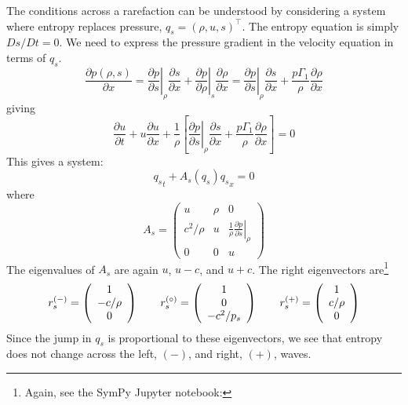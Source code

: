 The conditions across a rarefaction can be understood by considering
a system where entropy replaces pressure, $q_s = (\rho, u, s)^\intercal$.
The entropy equation is simply $Ds/Dt = 0$.  We need to express the
pressure gradient in the velocity equation in terms of $q_s$.
\begin{equation}
\frac{\partial p(\rho, s)}{\partial x} =
  \left . \frac{\partial p}{\partial s} \right |_\rho \frac{\partial s}{\partial x} +
  \left . \frac{\partial p}{\partial \rho} \right |_s \frac{\partial \rho}{\partial x}
=
  \left . \frac{\partial p}{\partial s} \right |_\rho \frac{\partial s}{\partial x} +
  \frac{p\Gamma_1}{\rho} \frac{\partial \rho}{\partial x}
\end{equation}
giving
\begin{equation}
\frac{\partial u}{\partial t} + u \frac{\partial u}{\partial x} + \frac{1}{\rho} \left [
     \left . \frac{\partial p}{\partial s} \right |_\rho \frac{\partial s}{\partial x} +
          \frac{p\Gamma_1}{\rho} \frac{\partial \rho}{\partial x} \right ] = 0
\end{equation}
This gives a system:
\begin{equation}
{q_s}_t + A_s(q_s) {q_s}_x = 0
\end{equation}
where
\begin{equation}
A_s =
 \left ( \begin{array}{ccc} u & \rho & 0 \\
        c^2/\rho & u & \frac{1}{\rho} \left . \frac{\partial p}{\partial s}\right |_\rho \\
        0 & 0 & u \end{array} \right )
\end{equation}
The eigenvalues of $A_s$ are again $u$, $u-c$, and $u+c$.  The right eigenvectors
are\footnote{Again, see the {\sf SymPy} {\sf Jupyter} notebook:
}
\begin{align}
r_s^\evm = \left ( \begin{array}{c} 1 \\ -c/\rho \\ 0 \end{array} \right )
%
\qquad
r_s^\evz = \left ( \begin{array}{c} 1 \\ 0 \\ -c^2/p_s  \end{array} \right )
%
\qquad
r_s^\evp = \left ( \begin{array}{c} 1 \\ c/\rho \\ 0 \end{array} \right )
\end{align}
Since the jump in $q_s$ is proportional to these eigenvectors, we see that
entropy does not change across the left, $(-)$, and right, $(+)$, waves.


